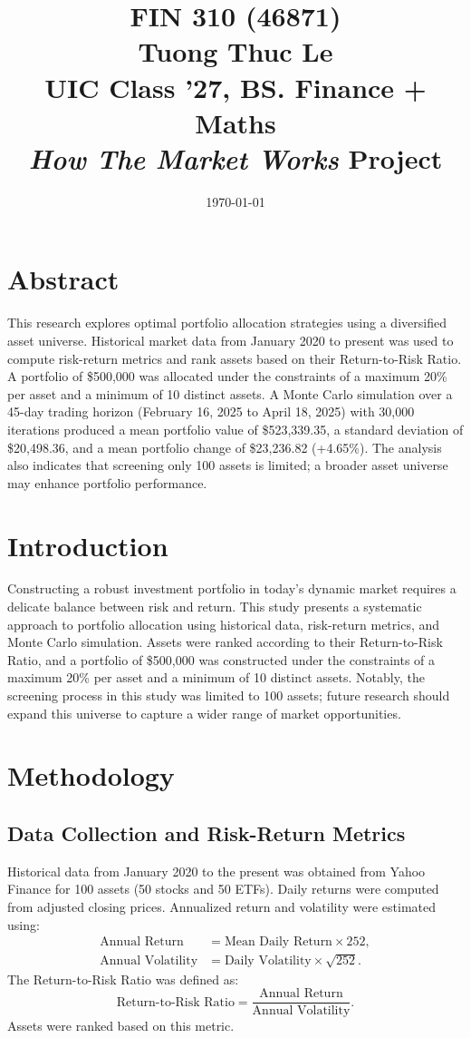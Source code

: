 \documentclass[11pt]{article}
\title{\vspace*{3cm}\centering FIN 310 (46871)\\[0.5em] Tuong Thuc Le\\[0.5em] UIC Class '27, BS. Finance + Maths\\[1em] \textit{How The Market Works} Project}
\author{}
\date{\vspace*{2cm} \today}
\begin{document}
\maketitle
\thispagestyle{empty}
\newpage

\tableofcontents
\newpage

\section*{Abstract}
This research explores optimal portfolio allocation strategies using a diversified asset universe. Historical market data from January 2020 to present was used to compute risk-return metrics and rank assets based on their Return-to-Risk Ratio. A portfolio of \$500,000 was allocated under the constraints of a maximum 20\% per asset and a minimum of 10 distinct assets. A Monte Carlo simulation over a 45-day trading horizon (February 16, 2025 to April 18, 2025) with 30,000 iterations produced a mean portfolio value of \$523,339.35, a standard deviation of \$20,498.36, and a mean portfolio change of \$23,236.82 (+4.65\%). The analysis also indicates that screening only 100 assets is limited; a broader asset universe may enhance portfolio performance.

\section{Introduction}
Constructing a robust investment portfolio in today’s dynamic market requires a delicate balance between risk and return. This study presents a systematic approach to portfolio allocation using historical data, risk-return metrics, and Monte Carlo simulation. Assets were ranked according to their Return-to-Risk Ratio, and a portfolio of \$500,000 was constructed under the constraints of a maximum 20\% per asset and a minimum of 10 distinct assets. Notably, the screening process in this study was limited to 100 assets; future research should expand this universe to capture a wider range of market opportunities.

\section{Methodology}
\subsection{Data Collection and Risk-Return Metrics}
Historical data from January 2020 to the present was obtained from Yahoo Finance for 100 assets (50 stocks and 50 ETFs). Daily returns were computed from adjusted closing prices. Annualized return and volatility were estimated using:
\begin{align*}
\text{Annual Return} &= \text{Mean Daily Return} \times 252,\\[1ex]
\text{Annual Volatility} &= \text{Daily Volatility} \times \sqrt{252}.
\end{align*}
The Return-to-Risk Ratio was defined as:
\[
\text{Return-to-Risk Ratio} = \frac{\text{Annual Return}}{\text{Annual Volatility}}.
\]
Assets were ranked based on this metric.
\end{document}
